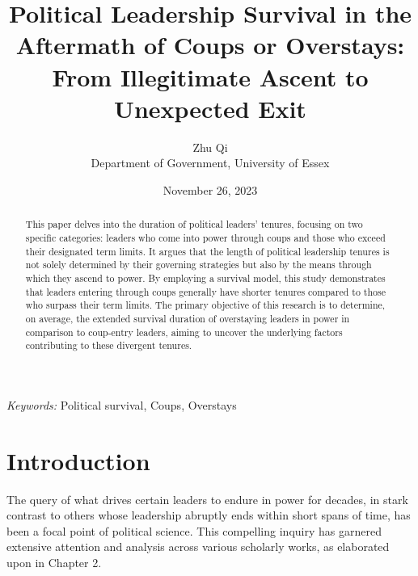 \documentclass[
  12pt,
  a4paper,
  12pt]{article}
\begin{document}
\def\spacingset#1{\renewcommand{\baselinestretch}%
{#1}\small\normalsize} \spacingset{1}



\date{November 26, 2023}
\title{\bf Political Leadership Survival in the Aftermath of Coups or
Overstays: From Illegitimate Ascent to Unexpected Exit}
\author{
Zhu Qi\\
Department of Government, University of Essex\\
}
\maketitle

\bigskip
\bigskip
\begin{abstract}
This paper delves into the duration of political leaders' tenures,
focusing on two specific categories: leaders who come into power through
coups and those who exceed their designated term limits. It argues that
the length of political leadership tenures is not solely determined by
their governing strategies but also by the means through which they
ascend to power. By employing a survival model, this study demonstrates
that leaders entering through coups generally have shorter tenures
compared to those who surpass their term limits. The primary objective
of this research is to determine, on average, the extended survival
duration of overstaying leaders in power in comparison to coup-entry
leaders, aiming to uncover the underlying factors contributing to these
divergent tenures.
\end{abstract}

\noindent%
{\it Keywords:} Political survival, Coups, Overstays
\vfill

\newpage
\spacingset{1.9} %
\ifdefined\Shaded\renewenvironment{Shaded}{\begin{tcolorbox}[frame hidden, boxrule=0pt, enhanced, sharp corners, borderline west={3pt}{0pt}{shadecolor}, breakable, interior hidden]}{\end{tcolorbox}}\fi

\hypertarget{introduction}{%
\section{Introduction}\label{introduction}}

The query of what drives certain leaders to endure in power for decades,
in stark contrast to others whose leadership abruptly ends within short
spans of time, has been a focal point of political science. This
compelling inquiry has garnered extensive attention and analysis across
various scholarly works, as elaborated upon in Chapter 2.
\end{document}
